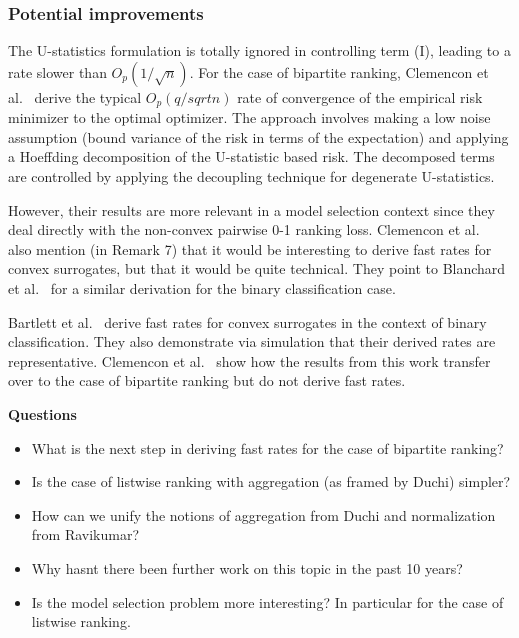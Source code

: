 \documentclass[a4paper,10pt]{article}
\begin{document}
\subsubsection{Potential improvements}
The U-statistics formulation is totally ignored in controlling term
(I), leading to a rate slower than \(O_p(1/\sqrt n)\). For the case of
bipartite ranking, Clemencon et
al.~\cite{clemencon-2008-ranking-rates} derive the typical \(O_p(q/sqrt n)\) rate of
convergence of the empirical risk minimizer to the optimal
optimizer. The approach involves making a low noise assumption (bound
variance of the risk in terms of the expectation) and applying a
Hoeffding decomposition of the U-statistic based risk. The decomposed
terms are controlled by applying the decoupling technique for
degenerate U-statistics.

However, their results are more relevant in a
model selection context since they deal directly with the non-convex
pairwise 0-1 ranking loss. Clemencon et
al.~\cite{clemencon-2008-ranking-rates} also mention (in Remark 7)
that it would be interesting to derive fast rates for convex
surrogates, but that it would be quite technical. They point to
Blanchard et al.~\cite{blanchard-2003-rates} for a similar derivation
for the binary classification case.

Bartlett et al.~\cite{bartlett-2006-risk} derive fast rates for convex
surrogates in the context of binary classification. They also
demonstrate via simulation that their derived rates are
representative. Clemencon et al.~\cite{clemencon-2008-ranking-rates}
show how the results from this work transfer over to the case of
bipartite ranking but do not derive fast rates.

\textbf{Questions}

\begin{itemize}
  \item What is the next step in deriving fast rates for the case of bipartite ranking?
  \item Is the case of listwise ranking with aggregation (as framed by Duchi) simpler?
  \item How can we unify the notions of aggregation from Duchi and normalization from Ravikumar?
  \item Why hasnt there been further work on this topic in the past 10 years?
  \item Is the model selection problem more interesting? In particular for the case of listwise ranking.
\end{itemize}

{}
\end{document}
